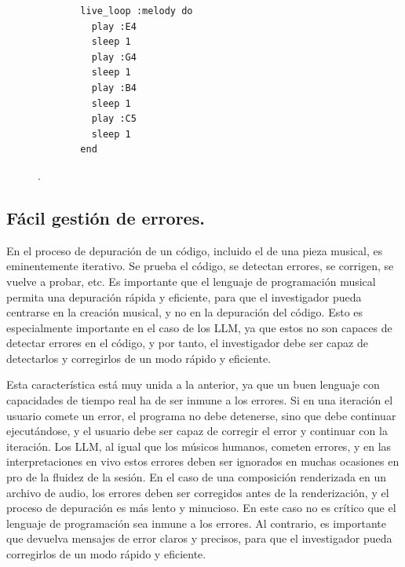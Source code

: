 \begin{figure}[h]
  \caption[Bucle infinito en \textit{Sonic Pi}]{Bucle infinito en \textit{Sonic Pi}. En este código se ejecutan cuatro notas, una por segundo en un bucle infinito. El usuario puede modificar las notas, y el cambio se ejecuta en el siguiente ciclo del bucle.}
  \centering
  \begin{subfigure}{.5\textwidth}
  \begin{mdframed}
  \begin{verbatim}
  live_loop :melody do
    play :E4
    sleep 1
    play :G4
    sleep 1
    play :B4
    sleep 1
    play :C5
    sleep 1
  end
  \end{verbatim}
  \end{mdframed}
  \end{subfigure}
  .
  \label{fig:sonic_pi_loop}
\end{figure}

\subsection{Fácil gestión de errores.} En el proceso de depuración de un código, incluido el de una pieza musical, es eminentemente iterativo. Se prueba el código, se detectan errores, se corrigen, se vuelve a probar, etc. Es importante que el lenguaje de programación musical permita una depuración rápida y eficiente, para que el investigador pueda centrarse en la creación musical, y no en la depuración del código. Esto es especialmente importante en el caso de los LLM, ya que estos no son capaces de detectar errores en el código, y por tanto, el investigador debe ser capaz de detectarlos y corregirlos de un modo rápido y eficiente.

Esta característica está muy unida a la anterior, ya que un buen lenguaje con capacidades de tiempo real ha de ser inmune a los errores. Si en una iteración el usuario comete un error, el programa no debe detenerse, sino que debe continuar ejecutándose, y el usuario debe ser capaz de corregir el error y continuar con la iteración. Los LLM, al igual que los músicos humanos, cometen errores, y en las interpretaciones en vivo estos errores deben ser ignorados en muchas ocasiones en pro de la fluidez de la sesión. En el caso de una composición renderizada en un archivo de audio, los errores deben ser corregidos antes de la renderización, y el proceso de depuración es más lento y minucioso. En este caso no es crítico que el lenguaje de programación sea inmune a los errores. Al contrario, es importante que devuelva mensajes de error claros y precisos, para que el investigador pueda corregirlos de un modo rápido y eficiente. 

